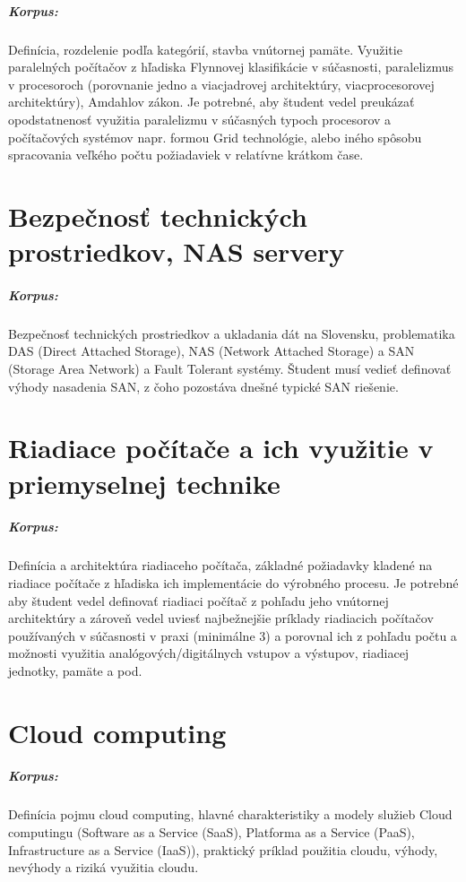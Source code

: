 \documentclass[11pt,a4paper]{report}
\begin{document}
\paragraph{Korpus:} Definícia, rozdelenie podľa kategórií, stavba vnútornej pamäte. Využitie paralelných počítačov z hľadiska Flynnovej klasifikácie v súčasnosti, paralelizmus v procesoroch (porovnanie jedno a viacjadrovej architektúry, viacprocesorovej architektúry), Amdahlov zákon. Je potrebné, aby študent vedel preukázať opodstatnenosť využitia paralelizmu v súčasných typoch procesorov a počítačových systémov napr. formou Grid technológie, alebo iného spôsobu spracovania veľkého počtu požiadaviek v relatívne krátkom čase. 

\chapter{Bezpečnosť technických prostriedkov, NAS servery}
\paragraph{Korpus:}Bezpečnosť technických prostriedkov a ukladania dát na Slovensku, problematika DAS (Direct Attached Storage), NAS (Network Attached Storage) a SAN (Storage Area Network) a Fault Tolerant systémy. Študent musí vedieť definovať výhody nasadenia SAN, z čoho pozostáva dnešné typické SAN riešenie. 

\chapter{Riadiace počítače a ich využitie v priemyselnej technike}
\paragraph{Korpus:} Definícia a architektúra riadiaceho počítača, základné požiadavky kladené na riadiace počítače z hľadiska ich implementácie do výrobného procesu. Je potrebné aby študent vedel definovať riadiaci počítač z pohľadu jeho vnútornej architektúry a zároveň vedel uviesť najbežnejšie príklady riadiacich počítačov používaných v súčasnosti v praxi (minimálne 3) a porovnal ich z pohľadu počtu a možnosti využitia analógových/digitálnych vstupov a výstupov, riadiacej jednotky, pamäte a pod.

\chapter{Cloud computing}
\paragraph{Korpus:} Definícia pojmu cloud computing, hlavné charakteristiky a modely služieb Cloud computingu (Software as a Service (SaaS), Platforma as a Service (PaaS), Infrastructure as a Service (IaaS)), praktický príklad použitia cloudu, výhody, nevýhody a riziká využitia cloudu.
\end{document}
